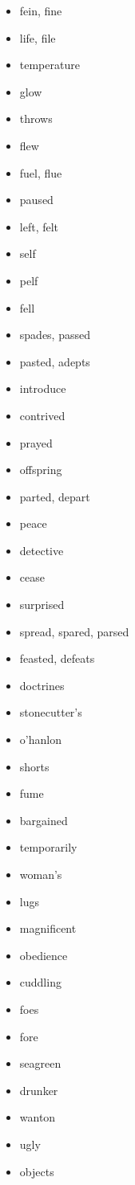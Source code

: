\documentclass{article}
\begin{document}
\begin{itemize}
    \item fein, fine
    \item life, file
    \item temperature
    \item glow
    \item throws
    \item flew
    \item fuel, flue
    \item paused
    \item left, felt
    \item self
    \item pelf
    \item fell
    \item spades, passed
    \item pasted, adepts
    \item introduce
    \item contrived
    \item prayed
    \item offspring
    \item parted, depart
    \item peace
    \item detective
    \item cease
    \item surprised
    \item spread, spared, parsed
    \item feasted, defeats
    \item doctrines
    \item stonecutter's
    \item o'hanlon
    \item shorts
    \item fume
    \item bargained
    \item temporarily
    \item woman's
    \item lugs
    \item magnificent
    \item obedience
    \item cuddling
    \item foes
    \item fore
    \item seagreen
    \item drunker
    \item wanton
    \item ugly
    \item objects

\end{itemize}
\end{document}
